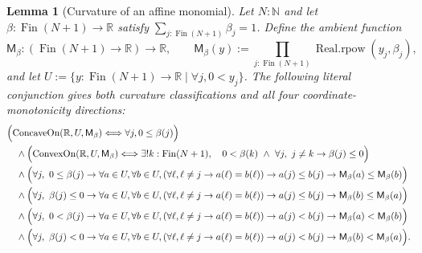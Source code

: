 \documentclass[9pt]{extarticle}
\newtheorem{lemma}{Lemma}[section]
\theoremstyle{definition}
\theoremstyle{remark}
\newcommand{\R}{\mathbb R}
\newcommand{\N}{\mathbb N}
\begin{document}
\begin{lemma}[Curvature of an affine monomial]\label{lem:monomial-curvature}
Let $N:\N$ and let $\beta:\operatorname{Fin}(N+1)\to\R$ satisfy
$\sum_{j:\operatorname{Fin}(N+1)}\beta_j=1$.  Define the ambient function
\[
 \mathsf M_\beta:(\operatorname{Fin}(N+1)\to\R)\to\R,
 \qquad
 \mathsf M_\beta(y):=\prod_{j:\operatorname{Fin}(N+1)}
   \operatorname{Real.rpow}(y_j,\beta_j),
\]
and let
$U:=\{y:\operatorname{Fin}(N+1)\to\R\mid\forall j,0<y_j\}$.  The following
literal conjunction gives both curvature classifications and all four
coordinate-monotonicity directions:
\begin{align*}
&\Bigl(\operatorname{ConcaveOn}(\R,U,\mathsf M_\beta)
 \Longleftrightarrow\forall j,0\leq\beta(j)\Bigr)\\
&\quad\wedge
\Bigl(\operatorname{ConvexOn}(\R,U,\mathsf M_\beta)
 \Longleftrightarrow
 \exists!k:\operatorname{Fin}(N+1),\quad
 0<\beta(k)\ \wedge\ \forall j,\ j\neq k\to\beta(j)\leq0\Bigr)\\
&\quad\wedge
\Bigl(\forall j,\ 0\leq\beta(j)\to
 \forall a\in U,\forall b\in U,
 (\forall \ell,\ell\neq j\to a(\ell)=b(\ell))\to
 a(j)\leq b(j)\to\mathsf M_\beta(a)\leq\mathsf M_\beta(b)\Bigr)\\
&\quad\wedge
\Bigl(\forall j,\ \beta(j)\leq0\to
 \forall a\in U,\forall b\in U,
 (\forall \ell,\ell\neq j\to a(\ell)=b(\ell))\to
 a(j)\leq b(j)\to\mathsf M_\beta(b)\leq\mathsf M_\beta(a)\Bigr)\\
&\quad\wedge
\Bigl(\forall j,\ 0<\beta(j)\to
 \forall a\in U,\forall b\in U,
 (\forall \ell,\ell\neq j\to a(\ell)=b(\ell))\to
 a(j)<b(j)\to\mathsf M_\beta(a)<\mathsf M_\beta(b)\Bigr)\\
&\quad\wedge
\Bigl(\forall j,\ \beta(j)<0\to
 \forall a\in U,\forall b\in U,
 (\forall \ell,\ell\neq j\to a(\ell)=b(\ell))\to
 a(j)<b(j)\to\mathsf M_\beta(b)<\mathsf M_\beta(a)\Bigr).
\end{align*}
\end{lemma}
\end{document}
